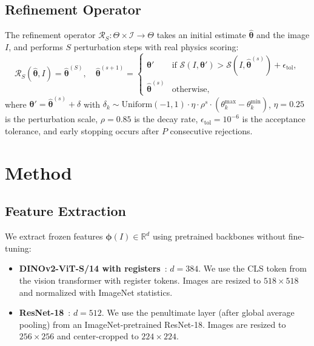 \documentclass[11pt,a4paper]{article}
\newcommand{\btheta}{\boldsymbol{\theta}}
\newcommand{\bphi}{\boldsymbol{\phi}}
\newcommand{\cS}{\mathcal{S}}
\newcommand{\cR}{\mathcal{R}}
\newcommand{\cI}{\mathcal{I}}
\newcommand{\Real}{\mathbb{R}}
\begin{document}
\subsection{Refinement Operator}

The refinement operator $\cR_S: \Theta \times \cI \to \Theta$ takes an initial
estimate $\hat{\btheta}$ and the image $I$, and performs $S$ perturbation steps
with real physics scoring:
\begin{equation}
\cR_S(\hat{\btheta}, I) = \hat{\btheta}^{(S)}, \quad
\hat{\btheta}^{(s+1)} = \begin{cases}
\btheta' & \text{if } \cS(I, \btheta') > \cS(I, \hat{\btheta}^{(s)}) + \epsilon_\text{tol}, \\
\hat{\btheta}^{(s)} & \text{otherwise},
\end{cases}
\end{equation}
where $\btheta' = \hat{\btheta}^{(s)} + \delta$ with
$\delta_k \sim \text{Uniform}(-1, 1) \cdot \eta \cdot \rho^s \cdot (\theta_k^\text{max} - \theta_k^\text{min})$,
$\eta = 0.25$ is the perturbation scale, $\rho = 0.85$ is the decay rate,
$\epsilon_\text{tol} = 10^{-6}$ is the acceptance tolerance,
and early stopping occurs after $P$ consecutive rejections.

\section{Method}
\label{sec:method}

\subsection{Feature Extraction}

We extract frozen features $\bphi(I) \in \Real^d$ using pretrained backbones
without fine-tuning:
\begin{itemize}[leftmargin=*,itemsep=2pt]
\item \textbf{DINOv2-ViT-S/14 with registers}~\cite{oquab2024dinov2,darcet2024vision}:
  $d=384$. We use the CLS token from the vision transformer with register tokens.
  Images are resized to $518 \times 518$ and normalized with ImageNet statistics.

\item \textbf{ResNet-18}~\cite{he2016deep}: $d=512$. We use the penultimate layer
  (after global average pooling) from an ImageNet-pretrained ResNet-18.
  Images are resized to $256 \times 256$ and center-cropped to $224 \times 224$.
\end{itemize}
\end{document}

